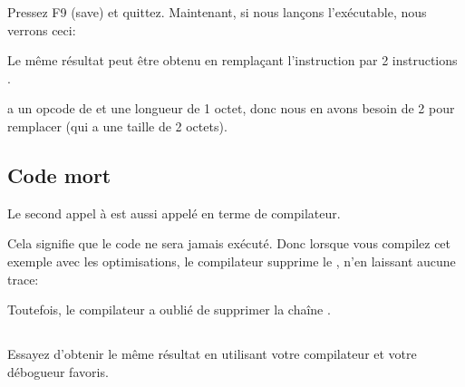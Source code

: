 Pressez F9 (save) et quittez. Maintenant, si nous lançons l'exécutable, nous verrons
ceci:



Le même résultat peut être obtenu en remplaçant l'instruction \JMP par 2 instructions
\NOP.

\NOP a un opcode de  et une longueur de 1 octet, donc nous en avons besoin
de 2 pour remplacer \JMP (qui a une taille de 2 octets).

\subsection{Code mort}

Le second appel à \printf est aussi appelé  en terme de compilateur.

Cela signifie que le code ne sera jamais exécuté.
Donc lorsque vous compilez cet exemple avec les optimisations, le compilateur supprime
le , n'en laissant aucune trace:



Toutefois, le compilateur a oublié de supprimer la chaîne .


\subsection{\Exercise}


Essayez d'obtenir le même résultat en utilisant votre compilateur et votre débogueur
favoris.
